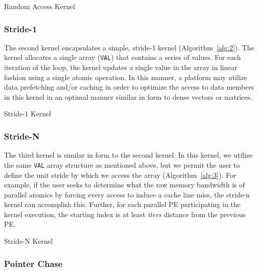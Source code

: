 \begin{algorithm}
\SetAlgoLined
{}
\caption{Random Access Kernel}
\label{alg:1}
\end{algorithm}

\subsubsection{Stride-1}
\label{subsubsec:stride1}

The second kernel encapsulates a simple, stride-1 kernel (Algorithm~\ref{alg:2}).  
The kernel allocates a single array (\texttt{VAL}) that contains a series of values.  
For each iteration of the loop, the kernel updates a single value in the array in linear fashion using a single atomic operation.
In this manner, a platform may utilize data prefetching and/or caching in order to optimize the access to data members in this kernel in an optimal manner similar in form to dense vectors or matrices.  

\begin{algorithm}
\SetAlgoLined
{}
\caption{Stride-1 Kernel}
\label{alg:2}
\end{algorithm}

\subsubsection{Stride-N}
\label{subsubsec:striden}

The third kernel is similar in form to the second kernel.
In this kernel, we utilize the same \texttt{VAL} array structure as mentioned above, but we permit the user to define the unit stride by which we access the array (Algorithm~\ref{alg:3}).  
For example, if the user seeks to determine what the raw memory bandwidth is of parallel atomics by forcing every access to induce a cache line miss, the stride-n kernel can accomplish this.
Further, for each parallel PE participating in the kernel execution, the starting index is at least \textit{iters} distance from the previous PE. 

\begin{algorithm}
\SetAlgoLined
{}
\caption{Stride-N Kernel}
\label{alg:3}
\end{algorithm}

\subsubsection{Pointer Chase}
\label{subsubsec:ptrchase}


